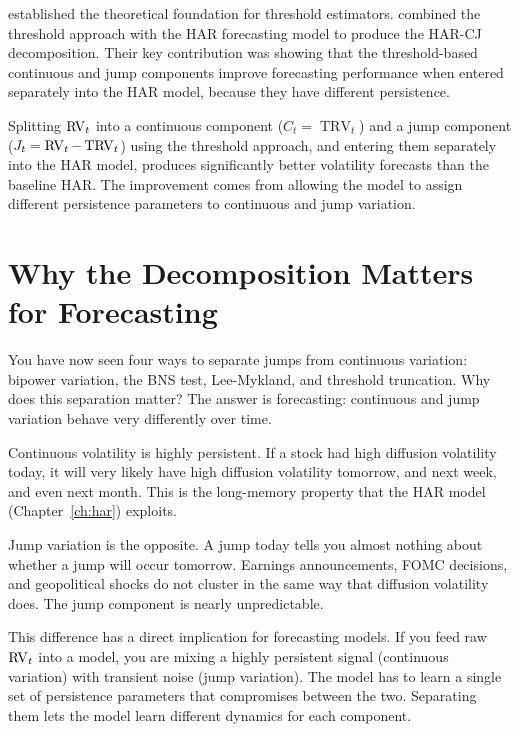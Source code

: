 \citet{Mancini2009} established the theoretical foundation for threshold estimators.
\citet{CorsiPirinoReno2010} combined the threshold approach with the HAR forecasting model to produce the HAR-CJ decomposition.
Their key contribution was showing that the threshold-based continuous and jump components improve forecasting performance when entered separately into the HAR model, because they have different persistence.

\begin{keyresult}
Splitting $\operatorname{RV}_t$ into a continuous component ($C_t = \operatorname{TRV}_t$) and a jump component ($J_t = \operatorname{RV}_t - \operatorname{TRV}_t$) using the threshold approach, and entering them separately into the HAR model, produces significantly better volatility forecasts than the baseline HAR.
The improvement comes from allowing the model to assign different persistence parameters to continuous and jump variation.
\end{keyresult}


\section{Why the Decomposition Matters for Forecasting}
\label{sec:decomposition-matters}

You have now seen four ways to separate jumps from continuous variation: bipower variation, the BNS test, Lee-Mykland, and threshold truncation.
Why does this separation matter?
The answer is forecasting: continuous and jump variation behave very differently over time.

\begin{intuition}
Continuous volatility is highly persistent.
If a stock had high diffusion volatility today, it will very likely have high diffusion volatility tomorrow, and next week, and even next month.
This is the long-memory property that the HAR model (Chapter~\ref{ch:har}) exploits.

Jump variation is the opposite.
A jump today tells you almost nothing about whether a jump will occur tomorrow.
Earnings announcements, FOMC decisions, and geopolitical shocks do not cluster in the same way that diffusion volatility does.
The jump component is nearly unpredictable.
\end{intuition}

This difference has a direct implication for forecasting models.
If you feed raw $\operatorname{RV}_t$ into a model, you are mixing a highly persistent signal (continuous variation) with transient noise (jump variation).
The model has to learn a single set of persistence parameters that compromises between the two.
Separating them lets the model learn different dynamics for each component.

